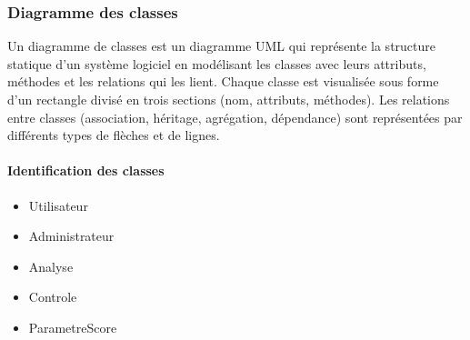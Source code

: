 \subsubsection{Diagramme des classes}

Un diagramme de classes est un diagramme UML qui repr\'esente la structure
statique d'un syst\`eme logiciel en mod\'elisant les classes avec leurs attributs,
m\'ethodes et les relations qui les lient. Chaque classe est visualis\'ee sous forme
d'un rectangle divis\'e en trois sections (nom, attributs, m\'ethodes). Les relations
entre classes (association, h\'eritage, agr\'egation, d\'ependance) sont
repr\'esent\'ees par diff\'erents types de fl\`eches et de lignes.

\paragraph{Identification des classes}
\begin{itemize}
  \item Utilisateur
  \item Administrateur
  \item Analyse
  \item Controle
  \item ParametreScore
\end{itemize}

